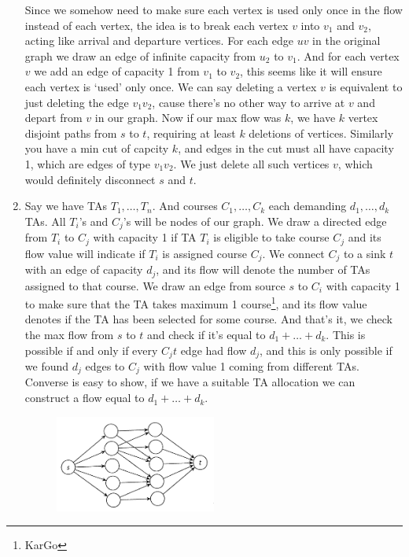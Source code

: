 \documentclass[12pt]{report}
\begin{document}
\begin{enumerate}[label=\textbf{\arabic*.}]
  Since we somehow need to make sure each vertex is used only once in the flow instead of each vertex, the idea is to break each vertex $v$ 
  into $v_1$ and $v_2$, acting like arrival and departure vertices. For each edge $uv$ in the original graph we draw an edge of infinite capacity
  from $u_2$ to $v_1$. And for each vertex $v$ we add an edge of capacity 1 from $v_1$ to $v_2$, this seems like it will ensure each vertex is `used'
  only once. We can say deleting a vertex $v$ is equivalent to just deleting the edge $v_1 v_2$, cause there's no other way to arrive at $v$ 
  and depart from $v$ in our graph. Now if our max flow was $k$, we have $k$ vertex disjoint paths from $s$ to $t$, requiring at least $k$ deletions
  of vertices. Similarly you have a min cut of capcity $k$, and edges in the cut must all have capacity 1, which are edges of type $v_1 v_2$. We
  just delete all such vertices $v$, which would definitely disconnect $s$ and $t$.

  \item Say we have TAs $T_1, \dots, T_n$. And courses $C_1, \dots, C_k$ each demanding $d_1, \dots, d_k$ TAs. All $T_i$'s and $C_j$'s will be nodes 
  of our graph. We draw a directed edge from $T_i$ to $C_j$ with capacity 1 if TA $T_i$ is eligible to take course $C_j$ and its flow value will
  indicate if $T_i$ is assigned course $C_j$. We connect $C_j$ to a sink
  $t$ with an edge of capacity $d_j$, and its flow will denote the number of TAs assigned to that course. We draw an edge from source $s$ to $C_i$
  with capacity 1 to make sure that the TA takes maximum 1 course\footnote{KarGo }, and its flow value denotes if the TA has 
  been selected for some course. And that's it, we check the max flow from $s$ to $t$ and check if it's equal to $d_1 + \dots + d_k$. This is possible 
  if and only if every $C_j t$ edge had flow $d_j$, and this is only possible if we found $d_j$ edges to $C_j$ with flow value 1 coming from different 
  TAs. Converse is easy to show, if we have a suitable TA allocation we can construct a flow equal to $d_1 + \dots + d_k$.

  \begin{figure}[H]
    \centering
    \includegraphics[width=0.5\textwidth]{TAallocation.png}  
  \end{figure}


\end{enumerate}
\end{document}
